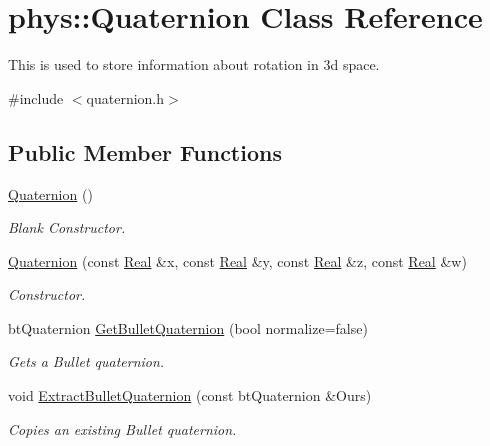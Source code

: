 \hypertarget{classphys_1_1Quaternion}{
\section{phys::Quaternion Class Reference}
\label{df/d8c/classphys_1_1Quaternion}
}


This is used to store information about rotation in 3d space.  




{\ttfamily \#include $<$quaternion.h$>$}

\subsection*{Public Member Functions}
\begin{DoxyCompactItemize}
\item 
\hyperlink{classphys_1_1Quaternion_aca4ee6fd6d3967f06cc4a32361fa5a62}{Quaternion} ()
\begin{DoxyCompactList}\small\item\em Blank Constructor. \item\end{DoxyCompactList}\item 
\hyperlink{classphys_1_1Quaternion_ac8037875c08ce10c0195f3e6fd08b172}{Quaternion} (const \hyperlink{namespacephys_af7eb897198d265b8e868f45240230d5f}{Real} \&x, const \hyperlink{namespacephys_af7eb897198d265b8e868f45240230d5f}{Real} \&y, const \hyperlink{namespacephys_af7eb897198d265b8e868f45240230d5f}{Real} \&z, const \hyperlink{namespacephys_af7eb897198d265b8e868f45240230d5f}{Real} \&w)
\begin{DoxyCompactList}\small\item\em Constructor. \item\end{DoxyCompactList}\item 
btQuaternion \hyperlink{classphys_1_1Quaternion_a30944ae1fe905ee4f5c946c9a0b354f7}{GetBulletQuaternion} (bool normalize=false)
\begin{DoxyCompactList}\small\item\em Gets a Bullet quaternion. \item\end{DoxyCompactList}\item 
void \hyperlink{classphys_1_1Quaternion_a10d3582b2731e70279d7bab43173f317}{ExtractBulletQuaternion} (const btQuaternion \&Ours)
\begin{DoxyCompactList}\small\item\em Copies an existing Bullet quaternion. \item\end{DoxyCompactList}\item 

\end{DoxyCompactItemize}
